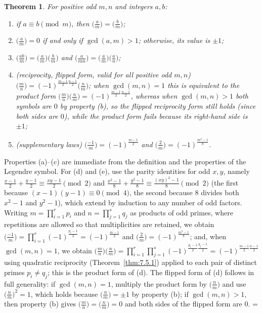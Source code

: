 \documentclass[11pt]{article}
\makeatletter
\let\nt@closedisplay\]
\def\nt@guardedclose{\@ifnextchar\par{\nt@closeafterpar}{\@ifnextchar\end{\postdisplaypenalty\@M\nt@closedisplay}{\nt@closedisplay}}}
\def\nt@closeafterpar\par{\@ifnextchar\par{\nt@closeafterpar}{\@ifnextchar\end{\postdisplaypenalty\@M\nt@closedisplay\par}{\nt@closedisplay\par}}}
\renewenvironment{proof}[1][\proofname]{\par
  \pushQED{\qed}\normalfont\topsep\medskipamount\edef\nt@afterproof{\@endparpenalty=\the\@endparpenalty\relax}\@beginparpenalty\@M\@endparpenalty\@M\let\]\nt@guardedclose\trivlist\item[]\textit{#1\@addpunct{.}} \ignorespaces}{\ifvmode\addpenalty\@M\fi\popQED\nt@afterproof\endtrivlist\@endpefalse}
\theoremstyle{ntstyle}
\newtheorem{theorem}{Theorem}[subsection]
\newcommand{\legs}[2]{\bigl(\tfrac{#1}{#2}\bigr)}
\makeatother
\begin{document}
\begin{theorem}\label{thm:7.6.1}
  For positive odd $m, n$ and integers $a, b$:

  \begin{enumerate}[label={\alph*)}]
    \item if $a \equiv b \pmod{m}$, then $\legs{a}{m} = \legs{b}{m}$;
    \item $\legs{a}{m} = 0$ if and only if $\gcd(a, m) > 1$; otherwise, its value is $\pm 1$;
    \item $\legs{ab}{m} = \legs{a}{m}\legs{b}{m}$ and $\legs{a}{mn} = \legs{a}{m}\legs{a}{n}$;
    \item (reciprocity, flipped form, valid for all positive odd $m, n$)
          $\legs{m}{n} = (-1)^{\frac{m-1}{2}\frac{n-1}{2}}\legs{n}{m}$; when
          $\gcd(m, n) = 1$ this is equivalent to the product form
          $\legs{m}{n}\legs{n}{m} = (-1)^{\frac{m-1}{2}\frac{n-1}{2}}$, whereas
          when $\gcd(m, n) > 1$ both symbols are $0$ by property (b), so the flipped reciprocity form still holds
          (since both sides are $0$), while the product form fails because its right-hand side is $\pm 1$;
    \item (supplementary laws) $\legs{-1}{m} = (-1)^{\frac{m-1}{2}}$ and $\legs{2}{m} = (-1)^{\frac{m^2-1}{8}}$.
  \end{enumerate}

\end{theorem}

\begin{proof} Properties (a)--(c) are immediate from the
  definition and the properties of the Legendre symbol. For (d) and (e), use the parity identities for
  odd $x, y$, namely $\tfrac{x-1}{2} + \tfrac{y-1}{2} \equiv \tfrac{xy-1}{2} \pmod{2}$ and
  $\tfrac{x^2-1}{8} + \tfrac{y^2-1}{8} \equiv \tfrac{(xy)^2-1}{8} \pmod{2}$ (the first because
  $(x-1)(y-1) \equiv 0 \pmod{4}$, the second because $8$ divides both $x^2-1$ and $y^2-1$), which
  extend by induction to any number of odd factors. Writing $m=\prod_{i=1}^{r}p_i$ and
  $n=\prod_{j=1}^{s}q_j$ as products of odd primes, where repetitions
  are allowed so that multiplicities are retained, we obtain
  $\legs{-1}{m}=\prod_{i=1}^{r} (-1)^{\frac{p_i-1}{2}} = (-1)^{\frac{m-1}{2}}$ and
  $\legs{2}{m} = (-1)^{\frac{m^2-1}{8}}$; and, when $\gcd(m, n) = 1$, we obtain
  $\legs{m}{n}\legs{n}{m}=\prod_{i=1}^{r}\prod_{j=1}^{s}(-1)^{\frac{p_i-1}{2}\frac{q_j-1}{2}} = (-1)^{\frac{m-1}{2}\frac{n-1}{2}}$
  using quadratic reciprocity (Theorem~\ref{thm:7.5.1}) applied to each pair of distinct primes $p_i \neq q_j$;
  this is
  the product form of (d). The flipped form of (d) follows in
  full generality: if $\gcd(m, n) = 1$, multiply the product form by
  $\legs{n}{m}$ and use $\legs{n}{m}^{2} = 1$, which holds because
  $\legs{n}{m} = \pm 1$ by property (b); if $\gcd(m, n) > 1$, then property (b)
  gives $\legs{m}{n} = \legs{n}{m} = 0$ and both sides of the flipped form
  are $0$.
\end{proof}
\end{document}
